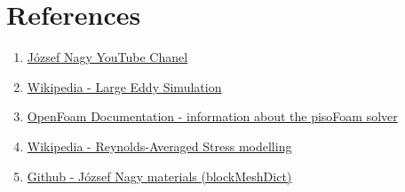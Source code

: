 \documentclass[a4paper]{article}
\begin{document}
\section{References}
\begin{enumerate}
\item \href{https://www.youtube.com/channel/UCjdgpuxuAxH9BqheyE82Vvw}{József Nagy YouTube Chanel} 
\item \href{https://en.wikipedia.org/wiki/Large_eddy_simulation}{Wikipedia - Large Eddy Simulation}
\item \href{https://www.openfoam.com/documentation/cpp-guide/html/pisoFoam_8C.html}{OpenFoam Documentation - information about the pisoFoam solver}
\item \href{https://en.wikipedia.org/wiki/Reynolds_stress_equation_model}{Wikipedia - Reynolds-Averaged Stress modelling}
\item \href{https://github.com/jnmlujnmlu/OpenFOAMTeaching/tree/master/JozsefNagy}{Github - József Nagy materials (blockMeshDict)}
\end{enumerate}
\end{document}
